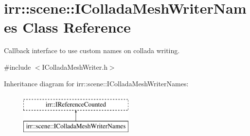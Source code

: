 \hypertarget{classirr_1_1scene_1_1IColladaMeshWriterNames}{}\section{irr\+:\+:scene\+:\+:I\+Collada\+Mesh\+Writer\+Names Class Reference}
\label{classirr_1_1scene_1_1IColladaMeshWriterNames}


Callback interface to use custom names on collada writing.  




{\ttfamily \#include $<$I\+Collada\+Mesh\+Writer.\+h$>$}

Inheritance diagram for irr\+:\+:scene\+:\+:I\+Collada\+Mesh\+Writer\+Names\+:\begin{figure}[H]
\begin{center}
\leavevmode
\includegraphics[height=2.000000cm]{classirr_1_1scene_1_1IColladaMeshWriterNames}
\end{center}
\end{figure}
